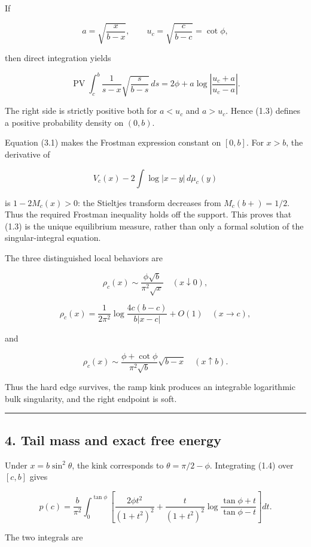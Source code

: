 If

\[
a=\sqrt{\frac{x}{b-x}},\qquad u_c=\sqrt{\frac{c}{b-c}}=\cot\phi,
\]

then direct integration yields

\[
\operatorname{PV}\!\int_c^b
\frac1{s-x}\sqrt{\frac{s}{b-s}}\,ds
=2\phi+a\log\left|\frac{u_c+a}{u_c-a}\right|. \tag{DS-3.7}
\]

The right side is strictly positive both for \(a<u_c\) and \(a>u_c\).
Hence (1.3) defines a positive probability density on \((0,b)\).

Equation (3.1) makes the Frostman expression constant on \([0,b]\). For
\(x>b\), the derivative of

\[
V_c(x)-2\int\log|x-y|\,d\mu_c(y)
\]

is \(1-2M_c(x)>0\): the Stieltjes transform decreases from
\(M_c(b+)=1/2\). Thus the required Frostman inequality holds off the support.
This proves that (1.3) is the unique equilibrium measure, rather than only a
formal solution of the singular-integral equation.

The three distinguished local behaviors are

\[
\rho_c(x)\sim\frac{\phi\sqrt b}{\pi^2\sqrt x}
\quad(x\downarrow0), \tag{DS-3.8}
\]

\[
\rho_c(x)=\frac1{2\pi^2}
\log\frac{4c(b-c)}{b|x-c|}+O(1)
\quad(x\to c), \tag{DS-3.9}
\]

and

\[
\rho_c(x)\sim
\frac{\phi+\cot\phi}{\pi^2\sqrt b}\sqrt{b-x}
\quad(x\uparrow b). \tag{DS-3.10}
\]

Thus the hard edge survives, the ramp kink produces an integrable logarithmic
bulk singularity, and the right endpoint is soft.

\begin{center}\rule{0.5\linewidth}{0.5pt}\end{center}

\subsection{4. Tail mass and exact free energy}

Under \(x=b\sin^2\theta\), the kink corresponds to
\(\theta=\pi/2-\phi\). Integrating (1.4) over \([c,b]\) gives

\[
p(c)=\frac{b}{\pi^2}
\int_0^{\tan\phi}
\left[
\frac{2\phi t^2}{(1+t^2)^2}
+\frac{t}{(1+t^2)^2}
\log\frac{\tan\phi+t}{\tan\phi-t}
\right]dt. \tag{DS-4.1}
\]

The two integrals are


